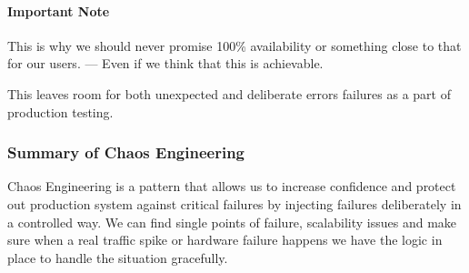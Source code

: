 \paragraph{Important Note}
This is why we should never promise 100\% availability or something close to that for our users.
--- Even if we think that this is achievable.

This leaves room for both unexpected and deliberate errors failures as a part of production testing.

\subsubsection{Summary of Chaos Engineering}
Chaos Engineering is a pattern that allows us to increase confidence and protect out production system against critical failures by injecting failures deliberately in a controlled way.
We can find single points of failure, scalability issues and make sure when a real traffic spike or hardware failure happens we have the logic in place to handle the situation gracefully.
